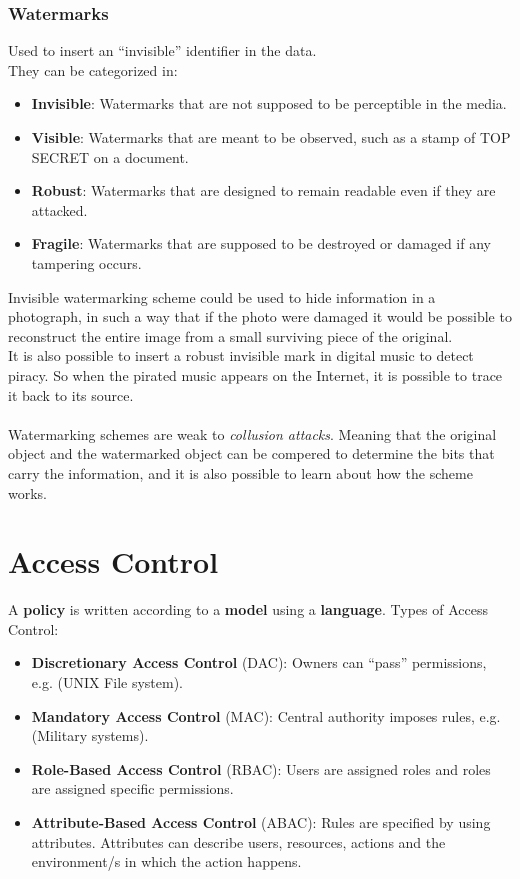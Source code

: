\documentclass[a4paper]{article}
\begin{document}
\subsubsection{Watermarks}
Used to insert an ``invisible'' identifier in the data.\\
They can be categorized in:
\begin{itemize}
    \item \textbf{Invisible}: Watermarks that are not supposed to be perceptible in the media.
    \item \textbf{Visible}: Watermarks that are meant to be observed, such as a stamp of TOP SECRET on a document.
    \item \textbf{Robust}: Watermarks that are designed to remain readable even if they are attacked.
    \item \textbf{Fragile}: Watermarks that are supposed to be destroyed or damaged if any tampering occurs.
\end{itemize}
Invisible watermarking scheme could be used to hide information in a photograph, in such a way that if the photo were damaged it would be possible to reconstruct the entire image from a small surviving piece of the original.\\
It is also possible to insert a robust invisible mark in digital music to detect piracy. So when the pirated music appears on the Internet, it is possible to trace it back to its source.\\\\
Watermarking schemes are weak to \textit{collusion attacks}. Meaning that the original object and the watermarked object can be compered to determine the bits that carry the information, and it is also possible to learn about how the scheme works.

\newpage
\section{Access Control}
A \textbf{policy} is written according to a \textbf{model} using a \textbf{language}.
Types of Access Control:
\begin{itemize}
    \item \textbf{Discretionary Access Control} (DAC): Owners can ``pass'' permissions, e.g. (UNIX File system).
    \item \textbf{Mandatory Access Control} (MAC): Central authority imposes rules, e.g. (Military systems).
    \item \textbf{Role-Based Access Control} (RBAC): Users are assigned roles and roles are assigned specific permissions.
    \item \textbf{Attribute-Based Access Control} (ABAC): Rules are specified by using attributes. Attributes can describe users, resources, actions and the environment/s in which the action happens.
\end{itemize}
\end{document}

